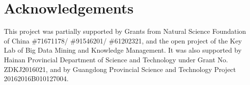 \documentclass[3p,times,procedia]{elsarticle}
\begin{document}
\section*{Acknowledgements}
This project was partially supported 
by Grants from Natural Science 
Foundation of China
\#71671178/ \#91546201/ \#61202321, 
and the open project of the Key Lab 
of Big Data Mining and
Knowledge Management. 
It was also supported by Hainan 
Provincial Department of Science 
and Technology under Grant 
No. ZDKJ2016021, and by 
Guangdong Provincial Science and
Technology Project 
20162016B010127004.






\end{document}
